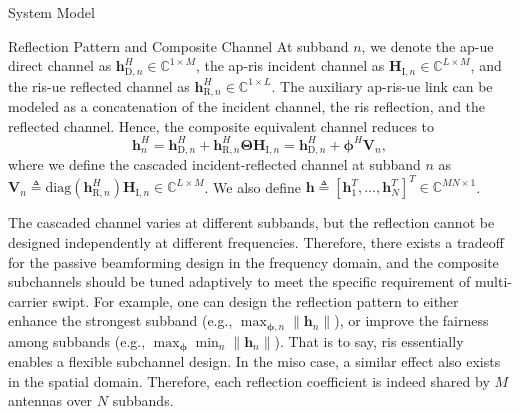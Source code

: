 \begin{section}{System Model}
\begin{subsection}{Reflection Pattern and Composite Channel}
		At subband $n$, we denote the \gls{ap}-\gls{ue} direct channel as $\boldsymbol{h}_{\mathrm{D},n}^H \in \mathbb{C}^{1 \times M}$, the \gls{ap}-\gls{ris} incident channel as $\boldsymbol{H}_{\mathrm{I},n} \in \mathbb{C}^{L \times M}$, and the \gls{ris}-\gls{ue} reflected channel as $\boldsymbol{h}_{\mathrm{R},n}^H \in \mathbb{C}^{1 \times L}$. The auxiliary \gls{ap}-\gls{ris}-\gls{ue} link can be modeled as a concatenation of the incident channel, the \gls{ris} reflection, and the reflected channel. Hence, the composite equivalent channel reduces to
		\begin{equation}\label{eq:h_n}
			\boldsymbol{h}_{n}^H = \boldsymbol{h}_{\mathrm{D},n}^H + \boldsymbol{h}_{\mathrm{R},n}^H \boldsymbol{\Theta} \boldsymbol{H}_{\mathrm{I},n} = \boldsymbol{h}_{\mathrm{D},n}^H + \boldsymbol{\phi}^H \boldsymbol{V}_{n},
		\end{equation}
		where we define the cascaded incident-reflected channel at subband $n$ as $\boldsymbol{V}_{n} \triangleq \mathrm{diag}(\boldsymbol{h}_{\mathrm{R},n}^H)\boldsymbol{H}_{\mathrm{I},n} \in \mathbb{C}^{L \times M}$. We also define $\boldsymbol{h} \triangleq [\boldsymbol{h}_1^T,\dots,\boldsymbol{h}_N^T]^T \in \mathbb{C}^{MN \times 1}$.

		\begin{remark}\label{re:subband_tradeoff}
			The cascaded channel varies at different subbands, but the reflection cannot be designed independently at different frequencies. Therefore, there exists a tradeoff for the passive beamforming design in the frequency domain, and the composite subchannels should be tuned adaptively to meet the specific requirement of multi-carrier \gls{swipt}. For example, one can design the reflection pattern to either enhance the strongest subband (e.g., $\max_{\boldsymbol{\phi},n} \lVert \boldsymbol{h}_n \rVert$), or improve the fairness among subbands (e.g., $\max_{\boldsymbol{\phi}} \min_n \lVert \boldsymbol{h}_n \rVert$). That is to say, \gls{ris} essentially enables a flexible subchannel design. In the \gls{miso} case, a similar effect also exists in the spatial domain. Therefore, each reflection coefficient is indeed shared by $M$ antennas over $N$ subbands.
		\end{remark}
	\end{subsection}



\end{section}
